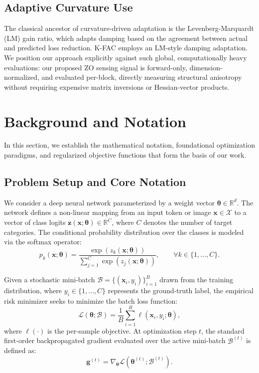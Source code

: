 \documentclass[conference]{IEEEtran}
\begin{document}
\subsection{Adaptive Curvature Use}
The classical ancestor of curvature-driven adaptation is the Levenberg-Marquardt (LM) gain ratio, which adapts damping based on the agreement between actual and predicted loss reduction. K-FAC employs an LM-style damping adaptation. We position our approach explicitly against such global, computationally heavy evaluations: our proposed ZO sensing signal is forward-only, dimension-normalized, and evaluated per-block, directly measuring structural anisotropy without requiring expensive matrix inversions or Hessian-vector products.



\section{Background and Notation}
\label{sec:background}

In this section, we establish the mathematical notation, foundational optimization paradigms, and regularized objective functions that form the basis of our work.

\subsection{Problem Setup and Core Notation}
\label{subsec:notation}

We consider a deep neural network parameterized by a weight vector $\boldsymbol{\theta} \in \mathbb{R}^{d}$. The network defines a non-linear mapping from an input token or image $\mathbf{x} \in \mathcal{X}$ to a vector of class logits $\mathbf{z}(\mathbf{x}; \boldsymbol{\theta}) \in \mathbb{R}^{C}$, where $C$ denotes the number of target categories. The conditional probability distribution over the classes is modeled via the softmax operator:
\begin{equation}
p_k(\mathbf{x}; \boldsymbol{\theta}) = \frac{\exp\left(z_k(\mathbf{x}; \boldsymbol{\theta})\right)}{\sum_{j=1}^{C} \exp\left(z_j(\mathbf{x}; \boldsymbol{\theta})\right)}, \qquad \forall k \in \{1, \dots, C\}.
\label{eq:softmax}
\end{equation}

Given a stochastic mini-batch $\mathcal{B} = \{(\mathbf{x}_i, y_i)\}_{i=1}^{B}$ drawn from the training distribution, where $y_i \in \{1, \dots, C\}$ represents the ground-truth label, the empirical risk minimizer seeks to minimize the batch loss function:
\begin{equation}
\mathcal{L}(\boldsymbol{\theta}; \mathcal{B}) = \frac{1}{B}\sum_{i=1}^{B}\ell(\mathbf{x}_i, y_i; \boldsymbol{\theta}),
\label{eq:batch_loss}
\end{equation}
where $\ell(\cdot)$ is the per-sample objective. At optimization step $t$, the standard first-order backpropagated gradient evaluated over the active mini-batch $\mathcal{B}^{(t)}$ is defined as:
\begin{equation}
\mathbf{g}^{(t)} = \nabla_{\boldsymbol{\theta}} \mathcal{L}(\boldsymbol{\theta}^{(t)}; \mathcal{B}^{(t)}).
\label{eq:full_grad}
\end{equation}
\end{document}
